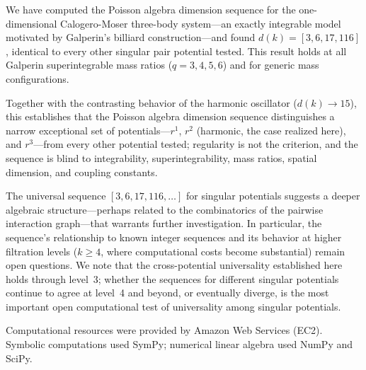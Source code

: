 \documentclass[aps,prl,twocolumn,superscriptaddress,showpacs]{revtex4-2}
\begin{document}
We have computed the Poisson algebra dimension sequence for the
one-dimensional Calogero-Moser three-body system---an exactly
integrable model motivated by Galperin's billiard construction---and
found $d(k) = [3, 6, 17, 116]$, identical to every other singular
pair potential tested.  This result holds at all Galperin
superintegrable mass ratios ($q = 3, 4, 5, 6$) and for generic mass
configurations.

Together with the contrasting behavior of the harmonic oscillator
($d(k) \to 15$), this establishes that the Poisson algebra dimension
sequence distinguishes a narrow exceptional set of potentials---$r^1$,
$r^2$ (harmonic, the case realized here), and $r^3$---from every
other potential tested; regularity is not the criterion, and the
sequence is blind to integrability, superintegrability, mass ratios,
spatial dimension, and coupling constants.

The universal sequence $[3, 6, 17, 116, \ldots]$ for singular
potentials suggests a deeper algebraic structure---perhaps related to
the combinatorics of the pairwise interaction graph---that warrants
further investigation.  In particular, the sequence's relationship to
known integer sequences and its behavior at higher filtration levels
($k \geq 4$, where computational costs become substantial) remain
open questions.  We note that the cross-potential universality
established here holds through level~3; whether the sequences for
different singular potentials continue to agree at level~4 and beyond,
or eventually diverge, is the most important open computational test
of universality among singular potentials.

\begin{acknowledgments}
Computational resources were provided by Amazon Web Services (EC2).
Symbolic computations used SymPy; numerical linear algebra used
NumPy and SciPy.
\end{acknowledgments}
\end{document}
